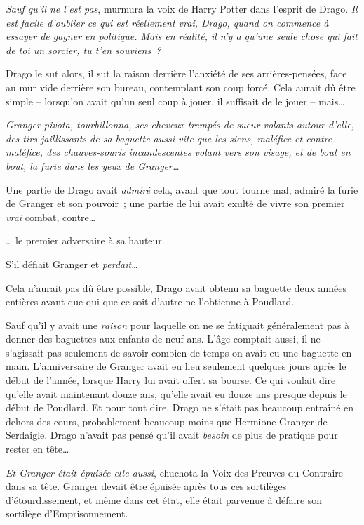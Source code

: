 \emph{Sauf qu'il ne l'est pas}, murmura la voix de Harry Potter dans l'esprit de Drago. \emph{Il est facile d'oublier ce qui est réellement vrai, Drago, quand on commence à essayer de gagner en politique. Mais en réalité, il n'y a qu'une seule chose qui fait de toi un sorcier, tu t'en souviens~?}

Drago le sut alors, il sut la raison derrière l'anxiété de ses arrières-pensées, face au mur vide derrière son bureau, contemplant son coup forcé. Cela aurait dû être simple -- lorsqu'on avait qu'un seul coup à jouer, il suffisait de le jouer -- mais…

\emph{Granger pivota, tourbillonna, ses cheveux trempés de sueur volants autour d'elle, des tirs jaillissants de sa baguette aussi vite que les siens, maléfice et contre-maléfice, des chauves-souris incandescentes volant vers son visage, et de bout en bout, la furie dans les yeux de Granger…}

Une partie de Drago avait \emph{admiré} cela, avant que tout tourne mal, admiré la furie de Granger et son pouvoir~; une partie de lui avait exulté de vivre son premier \emph{vrai} combat, contre…

… le premier adversaire à sa hauteur.

S'il défiait Granger et \emph{perdait}…

Cela n'aurait pas dû être possible, Drago avait obtenu sa baguette deux années entières avant que qui que ce soit d'autre ne l'obtienne à Poudlard.

Sauf qu'il y avait une \emph{raison} pour laquelle on ne se fatiguait généralement pas à donner des baguettes aux enfants de neuf ans. L'âge comptait aussi, il ne s'agissait pas seulement de savoir combien de temps on avait eu une baguette en main. L'anniversaire de Granger avait eu lieu seulement quelques jours après le début de l'année, lorsque Harry lui avait offert sa bourse. Ce qui voulait dire qu'elle avait maintenant douze ans, qu'elle avait eu douze ans presque depuis le début de Poudlard. Et pour tout dire, Drago ne s'était pas beaucoup entraîné en dehors des cours, probablement beaucoup moins que Hermione Granger de Serdaigle. Drago n'avait pas pensé qu'il avait \emph{besoin} de plus de pratique pour rester en tête…

\emph{Et Granger était épuisée elle aussi}, chuchota la Voix des Preuves du Contraire dans sa tête. Granger devait être épuisée après tous ces sortilèges d'étourdissement, et même dans cet état, elle était parvenue à défaire son sortilège d'Emprisonnement.

